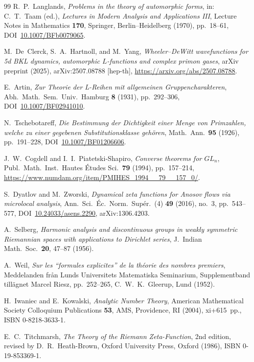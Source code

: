 \documentclass[11pt]{article}
\theoremstyle{definition}
\theoremstyle{remark}
\begin{document}
\begin{thebibliography}{99}
R.~P.~Langlands, \emph{Problems in the theory of automorphic
forms}, in: C.~T.~Taam (ed.), \emph{Lectures in Modern Analysis
and Applications III}, Lecture Notes in Mathematics \textbf{170},
Springer, Berlin--Heidelberg (1970), pp.~18--61,
DOI~\href{https://doi.org/10.1007/BFb0079065}{10.1007/BFb0079065}.

M.~De~Clerck, S.~A.~Hartnoll, and M.~Yang,
\emph{Wheeler--DeWitt wavefunctions for 5d BKL dynamics, automorphic
$L$-functions and complex primon gases}, arXiv preprint (2025),
arXiv:2507.08788 [hep-th],
\url{https://arxiv.org/abs/2507.08788}.

E.~Artin, \emph{Zur Theorie der L-Reihen mit allgemeinen
Gruppencharakteren}, Abh.\ Math.\ Sem.\ Univ.\ Hamburg \textbf{8}
(1931), pp.~292--306,
DOI~\href{https://doi.org/10.1007/BF02941010}{10.1007/BF02941010}.

N.~Tschebotareff, \emph{Die Bestimmung der Dichtigkeit einer Menge
von Primzahlen, welche zu einer gegebenen Substitutionsklasse
geh\"oren}, Math.\ Ann.\ \textbf{95} (1926), pp.~191--228,
DOI~\href{https://doi.org/10.1007/BF01206606}{10.1007/BF01206606}.

J.~W.~Cogdell and I.~I.~Piatetski-Shapiro, \emph{Converse theorems
for $GL_n$}, Publ.\ Math.\ Inst.\ Hautes \'Etudes Sci.\ \textbf{79}
(1994), pp.~157--214,
\url{https://www.numdam.org/item/PMIHES_1994__79__157_0/}.

S.~Dyatlov and M.~Zworski, \emph{Dynamical zeta functions for
Anosov flows via microlocal analysis}, Ann.\ Sci.\ \'Ec.\ Norm.\
Sup\'er.\ (4) \textbf{49} (2016), no.~3, pp.~543--577,
DOI~\href{https://doi.org/10.24033/asens.2290}{10.24033/asens.2290},
arXiv:1306.4203.

A.~Selberg, \emph{Harmonic analysis and discontinuous groups in
weakly symmetric Riemannian spaces with applications to Dirichlet
series}, J.\ Indian Math.\ Soc.\ \textbf{20}, 47--87 (1956).

A.~Weil, \emph{Sur les ``formules explicites'' de la th\'eorie des
nombres premiers}, Meddelanden fr\aa n Lunds Universitets
Matematiska Seminarium, Supplementband tillägnet Marcel Riesz,
pp.~252--265, C.~W.~K.\ Gleerup, Lund (1952).

H.~Iwaniec and E.~Kowalski, \emph{Analytic Number Theory}, American
Mathematical Society Colloquium Publications \textbf{53}, AMS,
Providence, RI (2004), xi+615~pp., ISBN 0-8218-3633-1.

E.~C.~Titchmarsh, \emph{The Theory of the Riemann Zeta-Function},
2nd edition, revised by D.~R.~Heath-Brown, Oxford University Press,
Oxford (1986), ISBN 0-19-853369-1.

\end{thebibliography}
\end{document}
